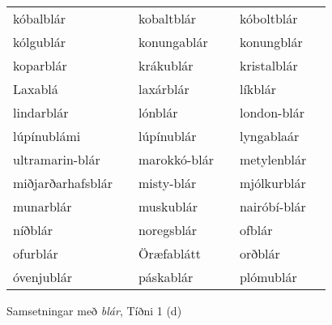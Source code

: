 \documentclass[../samsetningasafn.tex]{subfiles}
\begin{document}
\begin{wordlist}[H]
\begin{tcolorbox}
\begin{tabular}{BlBlBl}
		kóbalblár		&		& 
		kobaltblár		&		& 
		kóboltblár		&		\\  %
		kólgublár		&		& 
		konungablár		&		& 
		konungblár		&		\\  %
		koparblár		&		& 
		krákublár		&		& 
		kristalblár		&		\\  %
		Laxablá			&		& 
		laxárblár		&		& 
		líkblár			&		\\  %
		lindarblár		&		& 
		lónblár			&		& 
		london-blár		&		\\  %
		lúpínublámi		&		& 
		lúpínublár		&		& 
		lyngablaár		&		\\  %
		ultramarin-blár	&		& 
		marokkó-blár	&		& 
		metylenblár		&		\\  %
		miðjarðarhafsblár &		& 
		misty-blár		&		& 
		mjólkurblár		&		\\  %
		munarblár		&		& 
		muskublár		&		& 
		nairóbí-blár		&		\\  %
		níðblár			&		& 
		noregsblár		&		& 
		ofblár			&		\\  %
		ofurblár			&		& 
		Öræfablátt		&		& 
		orðblár			&		\\  %
		óvenjublár		&		& 
		páskablár		&		& 
		plómublár		&		  %
	\end{tabular}

\end{tcolorbox}
	\caption{Samsetningar með \textit{blár}, Tíðni 1 (d)}
	\label{listi:blatt.1d}
\end{wordlist}		
		
\end{document}

